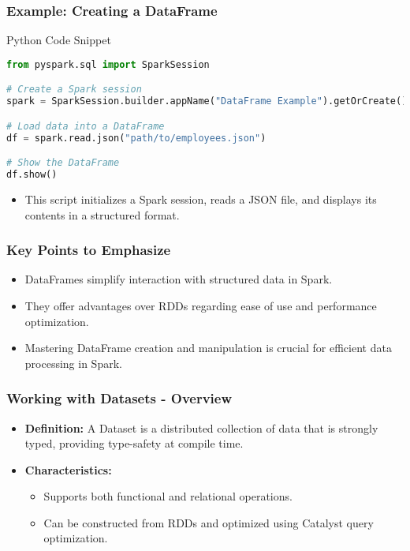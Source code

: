 \documentclass{beamer}
\begin{document}
\begin{frame}[fragile]
    \frametitle{Example: Creating a DataFrame}
    \begin{block}{Python Code Snippet}
        \begin{lstlisting}[language=Python]
from pyspark.sql import SparkSession

# Create a Spark session
spark = SparkSession.builder.appName("DataFrame Example").getOrCreate()

# Load data into a DataFrame
df = spark.read.json("path/to/employees.json")

# Show the DataFrame
df.show()
        \end{lstlisting}
    \end{block}
    \begin{itemize}
        \item This script initializes a Spark session, reads a JSON file, and displays its contents in a structured format.
    \end{itemize}
\end{frame}

\begin{frame}[fragile]
    \frametitle{Key Points to Emphasize}
    \begin{itemize}
        \item DataFrames simplify interaction with structured data in Spark.
        \item They offer advantages over RDDs regarding ease of use and performance optimization.
        \item Mastering DataFrame creation and manipulation is crucial for efficient data processing in Spark.
    \end{itemize}
\end{frame}

\begin{frame}[fragile]
    \frametitle{Working with Datasets - Overview}
    \begin{itemize}
        \item \textbf{Definition:} A Dataset is a distributed collection of data that is strongly typed, providing type-safety at compile time.
        \item \textbf{Characteristics:} 
        \begin{itemize}
            \item Supports both functional and relational operations.
            \item Can be constructed from RDDs and optimized using Catalyst query optimization.
        \end{itemize}
    \end{itemize}
\end{frame}
\end{document}
